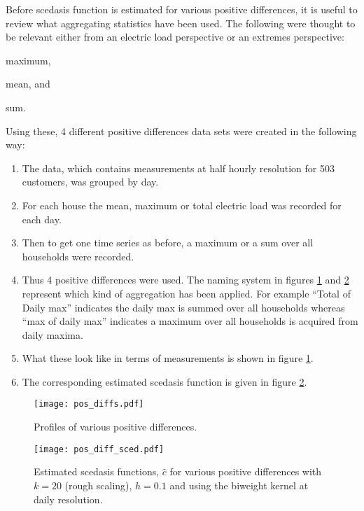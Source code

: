 Before scedasis function is estimated for various positive differences, it is useful to review what aggregating statistics have been used. The following were thought to be relevant either from an electric load perspective or an extremes perspective: \begin{enumerate*}[label=\roman*)] \item maximum, \item mean, and \item sum. \end{enumerate*} Using these, 4 different positive differences data sets were created in the following way:
\begin{enumerate}
\item The data, which contains measurements at half hourly resolution for 503 customers, was grouped by day.
\item For each house the mean, maximum or total electric load was recorded for each day.
\item Then to get one time series as before, a maximum or a sum over all households were recorded.
\item Thus 4 positive differences were used. The naming system in figures \ref{fig:pos_diff} and \ref{fig:pos_diff_sced} represent which kind of aggregation has been applied. For example ``Total of Daily max'' indicates the  daily max is summed over all households whereas ``max of daily max'' indicates a maximum over all households is acquired from daily maxima.
\item What these look like in terms of measurements is shown in figure \ref{fig:pos_diff}.
\item The corresponding estimated scedasis function is given in figure \ref{fig:pos_diff_sced}.
\end{enumerate}

\begin{figure}
\centering
\texttt{[image: pos\_diffs.pdf]}
\caption{\label{fig:pos_diff} Profiles of various positive differences.}
\end{figure}

\begin{figure}
\centering
\texttt{[image: pos\_diff\_sced.pdf]}
\caption{\label{fig:pos_diff_sced} Estimated scedasis functions, $\hat{c}$ for various positive differences with $k=20$ (rough scaling), $h=0.1$ and using the biweight kernel at daily resolution.}
\end{figure}

